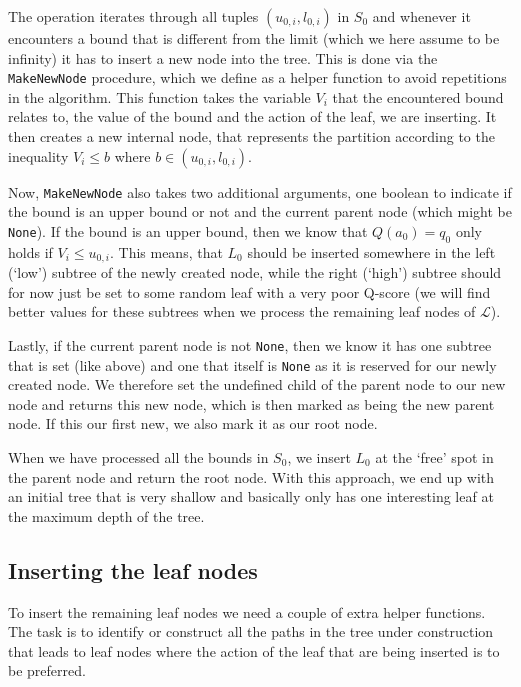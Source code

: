 The operation iterates through all tuples $(u_{0,i},l_{0,i})$ in $S_0$ and
whenever it encounters a bound that is different from the limit (which we here
assume to be infinity) it has to insert a new node into the tree. This is done
via the \texttt{MakeNewNode} procedure, which we define as a helper function to
avoid repetitions in the algorithm. This function takes the variable $V_i$ that
the encountered bound relates to, the value of the bound and the action of the
leaf, we are inserting. It then creates a new internal node, that represents
the partition according to the inequality $V_i \leq b$ where $b \in (u_{0,i},
l_{0,i})$.

Now, \texttt{MakeNewNode} also takes two additional arguments, one boolean to
indicate if the bound is an upper bound or not and the current parent node
(which might be \texttt{None}). If the bound is an upper bound, then we know
that $Q(a_0) = q_0$ only holds if $V_i \leq u_{0,i}$. This means, that $L_0$
should be inserted somewhere in the left (`low') subtree of the newly created
node, while the right (`high') subtree should for now just be set to some
random leaf with a very poor Q-score (we will find better values for these
subtrees when we process the remaining leaf nodes of $\mathcal{L}$).

Lastly, if the current parent node is not \texttt{None}, then we know it has one
subtree that is set (like above) and one that itself is \texttt{None} as it is
reserved for our newly created node. We therefore set the undefined child of the
parent node to our new node and returns this new node, which is then marked as
being the new parent node. If this our first new, we also mark it as our root
node.

When we have processed all the bounds in $S_0$, we insert $L_0$ at the `free'
spot in the parent node and return the root node. With this approach, we end up
with an initial tree that is very shallow and basically only has one interesting
leaf at the maximum depth of the tree. 

\subsection{Inserting the leaf nodes}

To insert the remaining leaf nodes we need a couple of extra helper functions. The
task is to identify or construct all the paths in the tree under construction
that leads to leaf nodes where the action of the leaf that are being inserted is
to be preferred.

